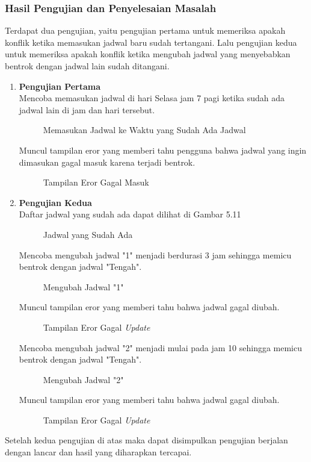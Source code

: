 \subsubsection{Hasil Pengujian dan Penyelesaian Masalah}
Terdapat dua pengujian, yaitu pengujian pertama untuk memeriksa apakah konflik ketika memasukan jadwal baru sudah tertangani. Lalu pengujian kedua untuk memeriksa apakah konflik ketika mengubah jadwal yang menyebabkan bentrok dengan jadwal lain sudah ditangani.
\begin{enumerate}
	\item \textbf{Pengujian Pertama}\\
	Mencoba memasukan jadwal di hari Selasa jam 7 pagi ketika sudah ada jadwal lain di jam dan hari tersebut.
\begin{figure} [H]
	\centering  
	\caption[Memasukan Jadwal ke Waktu yang Sudah Ada Jadwal]{Memasukan Jadwal ke Waktu yang Sudah Ada Jadwal} 
\end{figure}
	Muncul tampilan eror yang memberi tahu pengguna bahwa jadwal yang ingin dimasukan gagal masuk karena terjadi bentrok.
\begin{figure} [H]
	\centering  
	\caption[Tampilan Eror Gagal Masuk]{Tampilan Eror Gagal Masuk} 
\end{figure}

	\item \textbf{Pengujian Kedua}\\
	Daftar jadwal yang sudah ada dapat dilihat di Gambar 5.11
	\begin{figure} [H]
	\centering  
	\caption[Jadwal yang Sudah Ada]{Jadwal yang Sudah Ada} 
	\end{figure}
	Mencoba mengubah jadwal "1" menjadi berdurasi 3 jam sehingga memicu bentrok dengan jadwal "Tengah".
	\begin{figure} [H]
	\centering  
	\caption[Mengubah Jadwal "1"]{Mengubah Jadwal "1"} 
	\end{figure}
	Muncul tampilan eror yang memberi tahu bahwa jadwal gagal diubah.
	\begin{figure} [H]
	\centering  
	\caption[Tampilan Eror Gagal \textit{Update}]{Tampilan Eror Gagal \textit{Update}} 
	\end{figure}
	Mencoba mengubah jadwal "2" menjadi mulai pada jam 10 sehingga memicu bentrok dengan jadwal "Tengah".
	\begin{figure} [H]
	\centering  
	\caption[Mengubah Jadwal "2"]{Mengubah Jadwal "2"} 
	\end{figure}
	Muncul tampilan eror yang memberi tahu bahwa jadwal gagal diubah.
	\begin{figure} [H]
	\centering  
	\caption[Tampilan Eror Gagal \textit{Update}]{Tampilan Eror Gagal \textit{Update}} 
	\end{figure}
\end{enumerate}
Setelah kedua pengujian di atas maka dapat disimpulkan pengujian berjalan dengan lancar dan hasil yang diharapkan tercapai.

